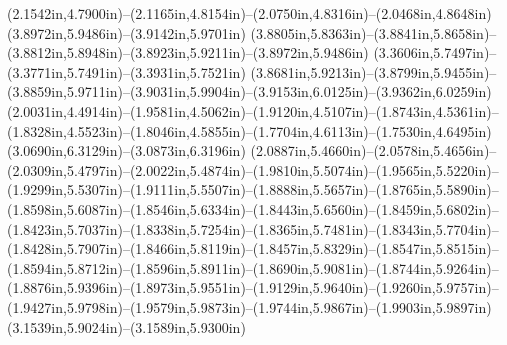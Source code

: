 (2.1542in,4.7900in)--(2.1165in,4.8154in)--(2.0750in,4.8316in)--(2.0468in,4.8648in) (3.8972in,5.9486in)--(3.9142in,5.9701in) (3.8805in,5.8363in)--(3.8841in,5.8658in)--(3.8812in,5.8948in)--(3.8923in,5.9211in)--(3.8972in,5.9486in) (3.3606in,5.7497in)--(3.3771in,5.7491in)--(3.3931in,5.7521in) (3.8681in,5.9213in)--(3.8799in,5.9455in)--(3.8859in,5.9711in)--(3.9031in,5.9904in)--(3.9153in,6.0125in)--(3.9362in,6.0259in) (2.0031in,4.4914in)--(1.9581in,4.5062in)--(1.9120in,4.5107in)--(1.8743in,4.5361in)--(1.8328in,4.5523in)--(1.8046in,4.5855in)--(1.7704in,4.6113in)--(1.7530in,4.6495in) (3.0690in,6.3129in)--(3.0873in,6.3196in) (2.0887in,5.4660in)--(2.0578in,5.4656in)--(2.0309in,5.4797in)--(2.0022in,5.4874in)--(1.9810in,5.5074in)--(1.9565in,5.5220in)--(1.9299in,5.5307in)--(1.9111in,5.5507in)--(1.8888in,5.5657in)--(1.8765in,5.5890in)--(1.8598in,5.6087in)--(1.8546in,5.6334in)--(1.8443in,5.6560in)--(1.8459in,5.6802in)--(1.8423in,5.7037in)--(1.8338in,5.7254in)--(1.8365in,5.7481in)--(1.8343in,5.7704in)--(1.8428in,5.7907in)--(1.8466in,5.8119in)--(1.8457in,5.8329in)--(1.8547in,5.8515in)--(1.8594in,5.8712in)--(1.8596in,5.8911in)--(1.8690in,5.9081in)--(1.8744in,5.9264in)--(1.8876in,5.9396in)--(1.8973in,5.9551in)--(1.9129in,5.9640in)--(1.9260in,5.9757in)--(1.9427in,5.9798in)--(1.9579in,5.9873in)--(1.9744in,5.9867in)--(1.9903in,5.9897in) (3.1539in,5.9024in)--(3.1589in,5.9300in)
